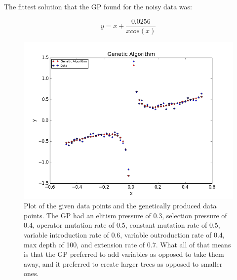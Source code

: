 \documentclass[11pt,amsmath,amssymb]{revtex4}
\begin{document}
The fittest solution that the GP found for the noisy data was:

\begin{equation}
y = x+\frac{0.0256}{xcos(x)}
\end{equation}



\begin{figure}[H]
\center
\includegraphics[scale=0.5]{Div_Noise.png}
\caption{Plot of the given data points and the genetically produced data points. The GP had an elitism pressure of 0.3, selection pressure of 0.4, operator mutation rate of 0.5, constant mutation rate of 0.5, variable introduction rate of 0.6, variable outroduction rate of 0.4, max depth of 100, and extension rate of 0.7. What all of that means is that the GP preferred to add variables as opposed to take them away, and it preferred to create larger trees as opposed to smaller ones.}
\label{q1}
\end{figure}
\end{document}
